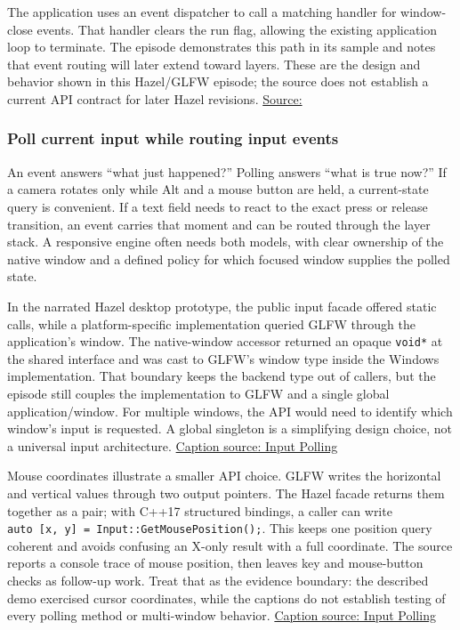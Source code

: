 The application uses an event dispatcher to call a matching handler for window-close events. That handler clears the run flag, allowing the existing application loop to terminate. The episode demonstrates this path in its sample and notes that event routing will later extend toward layers. These are the design and behavior shown in this Hazel/GLFW episode; the source does not establish a current API contract for later Hazel revisions. \href{https://www.youtube.com/watch?v=r74WxFMIEdU}{Source:}

\subsubsection{Poll current input while routing input events}\label{poll-current-input-while-routing-input-events}

An event answers ``what just happened?'' Polling answers ``what is true now?'' If a camera rotates only while Alt and a mouse button are held, a current-state query is convenient. If a text field needs to react to the exact press or release transition, an event carries that moment and can be routed through the layer stack. A responsive engine often needs both models, with clear ownership of the native window and a defined policy for which focused window supplies the polled state.

In the narrated Hazel desktop prototype, the public input facade offered static calls, while a platform-specific implementation queried GLFW through the application's window. The native-window accessor returned an opaque \texttt{void*} at the shared interface and was cast to GLFW's window type inside the Windows implementation. That boundary keeps the backend type out of callers, but the episode still couples the implementation to GLFW and a single global application/window. For multiple windows, the API would need to identify which window's input is requested. A global singleton is a simplifying design choice, not a universal input architecture. \href{https://www.youtube.com/watch?v=yuhNj8yGDJQ}{Caption source: Input Polling}

Mouse coordinates illustrate a smaller API choice. GLFW writes the horizontal and vertical values through two output pointers. The Hazel facade returns them together as a pair; with C++17 structured bindings, a caller can write \texttt{auto\ {[}x,\ y{]}\ =\ Input::GetMousePosition();}. This keeps one position query coherent and avoids confusing an X-only result with a full coordinate. The source reports a console trace of mouse position, then leaves key and mouse-button checks as follow-up work. Treat that as the evidence boundary: the described demo exercised cursor coordinates, while the captions do not establish testing of every polling method or multi-window behavior. \href{https://www.youtube.com/watch?v=yuhNj8yGDJQ}{Caption source: Input Polling}

